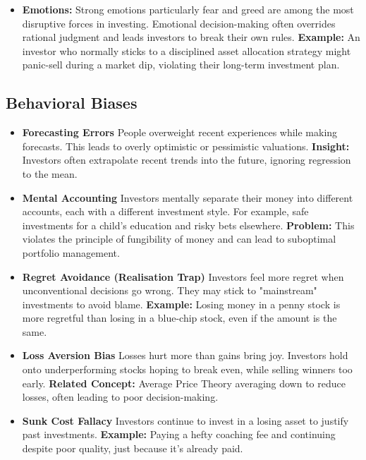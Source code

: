 \documentclass[12pt]{article}
\begin{document}
\begin{itemize}
  \item \textbf{Emotions:}
  Strong emotions particularly fear and greed are among the most disruptive forces in investing. Emotional decision-making often overrides rational judgment and leads investors to break their own rules.
  \textbf{Example:} An investor who normally sticks to a disciplined asset allocation strategy might panic-sell during a market dip, violating their long-term investment plan.
\end{itemize}

\subsection{Behavioral Biases}

\begin{itemize}
  \item \textbf{Forecasting Errors}
  People overweight recent experiences while making forecasts. This leads to overly optimistic or pessimistic valuations.
  \textbf{Insight:} Investors often extrapolate recent trends into the future, ignoring regression to the mean.

  \item \textbf{Mental Accounting}
  Investors mentally separate their money into different accounts, each with a different investment style. For example, safe investments for a child's education and risky bets elsewhere.
  \textbf{Problem:} This violates the principle of fungibility of money and can lead to suboptimal portfolio management.

  \item \textbf{Regret Avoidance (Realisation Trap)}
  Investors feel more regret when unconventional decisions go wrong. They may stick to "mainstream" investments to avoid blame.
  \textbf{Example:} Losing money in a penny stock is more regretful than losing in a blue-chip stock, even if the amount is the same.

  \item \textbf{Loss Aversion Bias}
  Losses hurt more than gains bring joy. Investors hold onto underperforming stocks hoping to break even, while selling winners too early.
  \textbf{Related Concept:} Average Price Theory averaging down to reduce losses, often leading to poor decision-making.

  \item \textbf{Sunk Cost Fallacy}
  Investors continue to invest in a losing asset to justify past investments.
  \textbf{Example:} Paying a hefty coaching fee and continuing despite poor quality, just because it's already paid.


\end{itemize}
\end{document}

